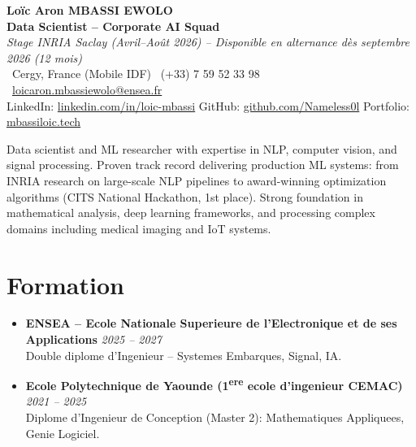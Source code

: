 \documentclass[a4paper,11pt]{article}
\begin{document}
\begin{center}
    {\Large \textbf{Lo\"ic Aron MBASSI EWOLO}} \\ \vspace{4pt}
    \textbf{\large Data Scientist -- Corporate AI Squad} \\
    \textit{\small Stage INRIA Saclay (Avril--Ao\^ut 2026) -- Disponible en alternance d\`es septembre 2026 (12 mois)} \\ \vspace{4pt}
    \small
    \Pointinghand\ Cergy, France (Mobile IDF) \quad
    \Mobilefone\ (+33) 7 59 52 33 98 \quad
    {\color{primary}\Letter\ \href{mailto:loicaron.mbassiewolo@ensea.fr}{loicaron.mbassiewolo@ensea.fr}} \\ \vspace{2pt}
    {\color{primary}LinkedIn: \href{https://www.linkedin.com/in/loic-mbassi/}{linkedin.com/in/loic-mbassi}} \quad
    {\color{primary}GitHub: \href{https://github.com/Nameless0l}{github.com/Nameless0l}} \quad
    {\color{primary}Portfolio: \href{https://mbassiloic.tech}{mbassiloic.tech}}
\end{center}
\vspace{-6pt}

\noindent\small{Data scientist and ML researcher with expertise in NLP, computer vision, and signal processing. Proven track record delivering production ML systems: from INRIA research on large-scale NLP pipelines to award-winning optimization algorithms (CITS National Hackathon, 1st place). Strong foundation in mathematical analysis, deep learning frameworks, and processing complex domains including medical imaging and IoT systems.}

\section{Formation}
\begin{itemize}[leftmargin=*, label=\tiny$\bullet$, nosep]
    \item \textbf{ENSEA -- Ecole Nationale Superieure de l'Electronique et de ses Applications} \hfill \textit{2025 -- 2027} \\
    \small{Double diplome d'Ingenieur -- Systemes Embarques, Signal, IA.}
    \item \textbf{Ecole Polytechnique de Yaounde (1\textsuperscript{ere} ecole d'ingenieur CEMAC)} \hfill \textit{2021 -- 2025} \\
    \small{Diplome d'Ingenieur de Conception (Master 2): Mathematiques Appliquees, Genie Logiciel.}
\end{itemize}
\end{document}
